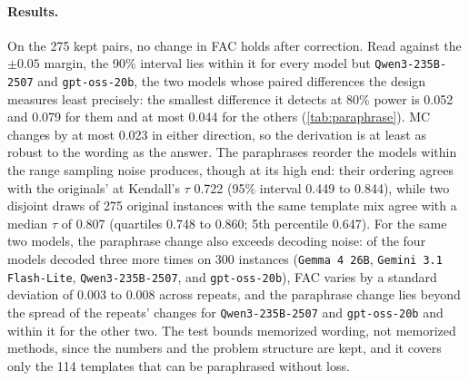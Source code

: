 \paragraph{Results.} On the 275 kept pairs, no change in FAC holds after correction.
Read against the $\pm 0.05$ margin, the 90\% interval lies within it for every model but
\texttt{Qwen3-235B-2507} and \texttt{gpt-oss-20b}, the two models whose paired differences the
design measures least precisely: the smallest difference it detects at 80\% power is 0.052 and
0.079 for them and at most 0.044 for the others (\autoref{tab:paraphrase}).
MC changes by at most 0.023 in either direction, so the derivation is at least as robust to the
wording as the answer.
The paraphrases reorder the models within the range sampling noise produces, though at its high end:
their ordering agrees with the originals' at Kendall's $\tau$ 0.722 (95\% interval 0.449 to 0.844),
while two disjoint draws of 275 original instances with the same template mix agree with a median
$\tau$ of 0.807 (quartiles 0.748 to 0.860; 5th percentile 0.647).
For the same two models, the paraphrase change also exceeds decoding noise: of the four models
decoded three more times on 300 instances (\texttt{Gemma 4 26B}, \texttt{Gemini 3.1 Flash-Lite},
\texttt{Qwen3-235B-2507}, and \texttt{gpt-oss-20b}), FAC varies by a standard deviation of 0.003 to
0.008 across repeats, and the paraphrase change lies beyond the spread of the repeats' changes for
\texttt{Qwen3-235B-2507} and \texttt{gpt-oss-20b} and within it for the other two.
The test bounds memorized wording, not memorized methods, since the numbers and the problem
structure are kept, and it covers only the 114 templates that can be paraphrased without loss.

